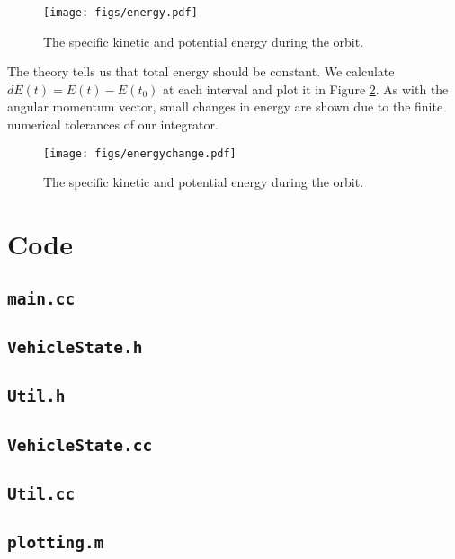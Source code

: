 \documentclass[11pt]{article}
\begin{document}
\begin{figure}[h!]
	\centering
	\texttt{[image: figs/energy.pdf]}
	\caption{The specific kinetic and potential energy during the orbit.}
	\label{fig:energy}
\end{figure}

The theory tells us that total energy should be constant. We calculate $dE(t) = E(t) - E(t_0)$ at each interval and plot it in Figure \ref{fig:energychange}. As with the angular momentum vector, small changes in energy are shown due to the finite numerical tolerances of our integrator.

\begin{figure}[h!]
	\centering
	\texttt{[image: figs/energychange.pdf]}
	\caption{The specific kinetic and potential energy during the orbit.}
	\label{fig:energychange}
\end{figure}

\newpage
\appendix
\section{Code}

\subsection{\texttt{main.cc}}


\subsection{\texttt{VehicleState.h}}


\subsection{\texttt{Util.h}}


\subsection{\texttt{VehicleState.cc}}


\subsection{\texttt{Util.cc}}



\subsection{\texttt{plotting.m}}

\end{document}
